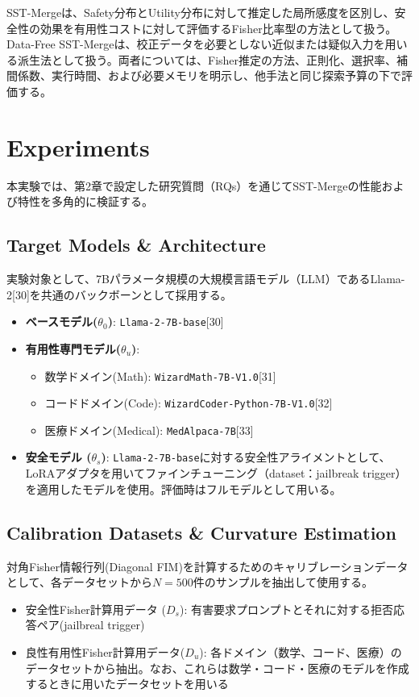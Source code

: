 \documentclass{article}
\begin{document}
SST-Mergeは、Safety分布とUtility分布に対して推定した局所感度を区別し、安全性の効果を有用性コストに対して評価するFisher比率型の方法として扱う。Data-Free SST-Mergeは、校正データを必要としない近似または疑似入力を用いる派生法として扱う。両者については、Fisher推定の方法、正則化、選択率、補間係数、実行時間、および必要メモリを明示し、他手法と同じ探索予算の下で評価する。

\section{Experiments}

本実験では、第2章で設定した研究質問（RQs）を通じてSST-Mergeの性能および特性を多角的に検証する。

\subsection{Target Models \& Architecture}
実験対象として、7Bパラメータ規模の大規模言語モデル（LLM）であるLlama-2[30]を共通のバックボーンとして採用する。



\begin{itemize}
\item \textbf{ベースモデル($\theta_0$)}: \texttt{Llama-2-7B-base}[30]
\item \textbf{有用性専門モデル($\theta_u$)}:
\begin{itemize}
  \item 数学ドメイン(Math): \texttt{WizardMath-7B-V1.0}[31]
  \item コードドメイン(Code): \texttt{WizardCoder-Python-7B-V1.0}[32]
  \item 医療ドメイン(Medical): \texttt{MedAlpaca-7B}[33]
\end{itemize}
\item \textbf{安全モデル ($\theta_s$)}: \texttt{Llama-2-7B-base}に対する安全性アライメントとして、LoRAアダプタを用いてファインチューニング（dataset：jailbreak trigger）を適用したモデルを使用。評価時はフルモデルとして用いる。
\end{itemize}

\subsection{Calibration Datasets \& Curvature Estimation}
対角Fisher情報行列(Diagonal FIM)を計算するためのキャリブレーションデータとして、各データセットから$N=500$件のサンプルを抽出して使用する。
\begin{itemize}
\item 安全性Fisher計算用データ ($D_s$): 有害要求プロンプトとそれに対する拒否応答ペア(jailbreal trigger)
\item 良性有用性Fisher計算用データ($D_u$): 各ドメイン（数学、コード、医療）のデータセットから抽出。なお、これらは数学・コード・医療のモデルを作成するときに用いたデータセットを用いる
\end{itemize}
\end{document}
